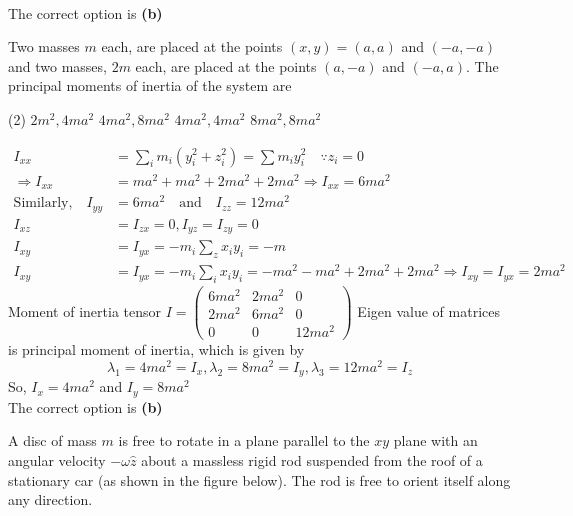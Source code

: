 \begin{enumerate}
\begin{answer}
\begin{align*}
 \end{align*}
 The correct option is \textbf{(b)}
\end{answer}
\begin{minipage}{\textwidth}
	\item Two masses $m$ each, are placed at the points $(x, y)=(a, a)$ and $(-a,-a)$ and two masses, $2 m$ each, are placed at the points $(a,-a)$ and $(-a, a)$. The principal moments of inertia of the system are
\end{minipage}
\begin{tasks}(2)
	\task[\textbf{A.}] $2 m^{2}, 4 m a^{2}$
	\task[\textbf{B.}]$4 m a^{2}, 8 m a^{2}$
	\task[\textbf{C.}] $4 m a^{2}, 4 m a^{2}$
	\task[\textbf{D.}] $8 m a^{2}, 8 m a^{2}$
\end{tasks}
\begin{answer}
 \begin{align*}
 I_{x x}&=\sum_{i} m_{i}\left(y_{i}^{2}+z_{i}^{2}\right)=\sum m_{i} y_{i}^{2} \quad \because z_{i}=0\\
 \Rightarrow I_{x x}&=m a^{2}+m a^{2}+2 m a^{2}+2 m a^{2} \Rightarrow I_{x x}=6 m a^{2}\\
 \text{Similarly,} \quad I_{y y}&=6 m a^{2} \quad \text{and}\quad  I_{z z}=12 m a^{2}\\
 I_{x z}&=I_{z x}=0, I_{y z}=I_{z y}=0\\
 I_{x y}&=I_{y x}=-m_{i} \sum_{z} x_{i} y_{i}=-m\\
 I_{x y}&=I_{y x}=-m_{i} \sum_{i} x_{i} y_{i}=-m a^{2}-m a^{2}+2 m a^{2}+2 m a^{2} \Rightarrow I_{x y}=I_{y x}=2 m a^{2}
 \end{align*}
 Moment of inertia tensor
 $
 I=\left(\begin{array}{ccc}
 6 m a^{2} & 2 m a^{2} & 0 \\
 2 m a^{2} & 6 m a^{2} & 0 \\
 0 & 0 & 12 m a^{2}
 \end{array}\right)
 $	
 Eigen value of matrices is principal moment of inertia, which is given by
 $$
 \lambda_{1}=4 m a^{2}=I_{x}, \lambda_{2}=8 m a^{2}=I_{y}, \lambda_{3}=12 m a^{2}=I_{z}
 $$
 So, $I_{x}=4 m a^{2}$ and $I_{y}=8 m a^{2}$\\
 The correct option is \textbf{(b)}
\end{answer}
\begin{minipage}{\textwidth}
	\item A disc of mass $m$ is free to rotate in a plane parallel to the $x y$ plane with an angular velocity $-\omega \hat{z}$ about a massless rigid rod suspended from the roof of a stationary car (as shown in the figure below). The rod is free to orient itself along any direction.

\end{minipage}
\end{enumerate}

